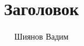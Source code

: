 \documentclass{beamer}
\title{Заголовок}
\author{Шиянов Вадим}
\begin{document}
\begin{frame}
    \titlepage
\end{frame}
\end{document}
